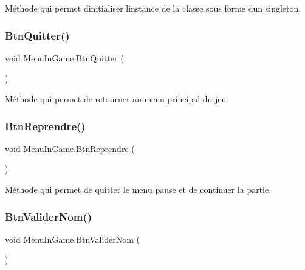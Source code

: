 Méthode qui permet d\textquotesingle{}initialiser l\textquotesingle{}instance de la classe sous forme d\textquotesingle{}un singleton. \mbox{\label{class_menu_in_game_a65e24e71034cd8b218c999b07a18bc56}} 
\subsubsection{\texorpdfstring{Btn\+Quitter()}{BtnQuitter()}}
{\footnotesize\ttfamily void Menu\+In\+Game.\+Btn\+Quitter (\begin{DoxyParamCaption}{ }\end{DoxyParamCaption})\hspace{0.3cm}{\ttfamily [inline]}}

Méthode qui permet de retourner au menu principal du jeu. \mbox{\label{class_menu_in_game_a1b037f338e34dda73cd80cd6ec0467ec}} 
\subsubsection{\texorpdfstring{Btn\+Reprendre()}{BtnReprendre()}}
{\footnotesize\ttfamily void Menu\+In\+Game.\+Btn\+Reprendre (\begin{DoxyParamCaption}{ }\end{DoxyParamCaption})\hspace{0.3cm}{\ttfamily [inline]}}

Méthode qui permet de quitter le menu pause et de continuer la partie. \mbox{\label{class_menu_in_game_af5b66d9ceddf95d9ed6c61791fed8fc6}} 
\subsubsection{\texorpdfstring{Btn\+Valider\+Nom()}{BtnValiderNom()}}
{\footnotesize\ttfamily void Menu\+In\+Game.\+Btn\+Valider\+Nom (\begin{DoxyParamCaption}{ }\end{DoxyParamCaption})\hspace{0.3cm}{\ttfamily [inline]}}

